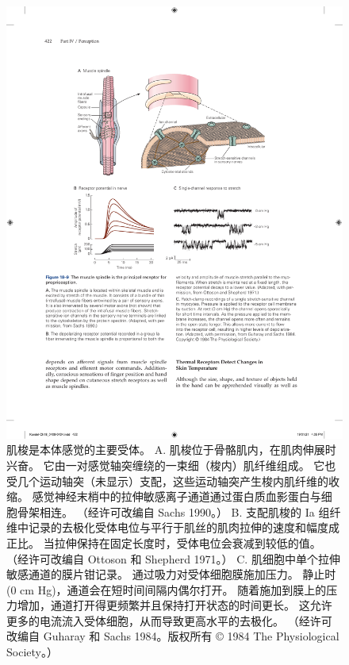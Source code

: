\begin{figure}[htbp]
	\centering
	\includegraphics[width=1.0\linewidth]{chap18/fig_18_9}
	\caption{肌梭是本体感觉的主要受体。
		A. 肌梭位于骨骼肌内，在肌肉伸展时兴奋。
		它由一对感觉轴突缠绕的一束细（梭内）肌纤维组成。
		它也受几个运动轴突（未显示）支配，这些运动轴突产生梭内肌纤维的收缩。
		感觉神经末梢中的拉伸敏感离子通道通过蛋白质血影蛋白与细胞骨架相连。 （经许可改编自 Sachs 1990。） 
		B. 支配肌梭的 Ia 组纤维中记录的去极化受体电位与平行于肌丝的肌肉拉伸的速度和幅度成正比。 
		当拉伸保持在固定长度时，受体电位会衰减到较低的值。 （经许可改编自 Ottoson 和 Shepherd 1971。）
		C. 肌细胞中单个拉伸敏感通道的膜片钳记录。 通过吸力对受体细胞膜施加压力。 
		静止时 (0 cm Hg)，通道会在短时间间隔内偶尔打开。 
		随着施加到膜上的压力增加，通道打开得更频繁并且保持打开状态的时间更长。 
		这允许更多的电流流入受体细胞，从而导致更高水平的去极化。 （经许可改编自 Guharay 和 Sachs 1984。版权所有 © 1984 The Physiological Society。）}
	\label{fig:18_9}
\end{figure}

